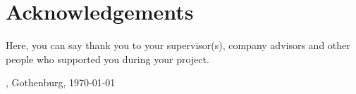 \thispagestyle{plain}			%
\section*{Acknowledgements}
Here, you can say thank you to your supervisor(s), company advisors and other people who supported you during your project.

\vspace{1.5cm}
\hfill
\authorName, Gothenburg, \today

\newpage				%
\thispagestyle{empty}
\mbox{}
